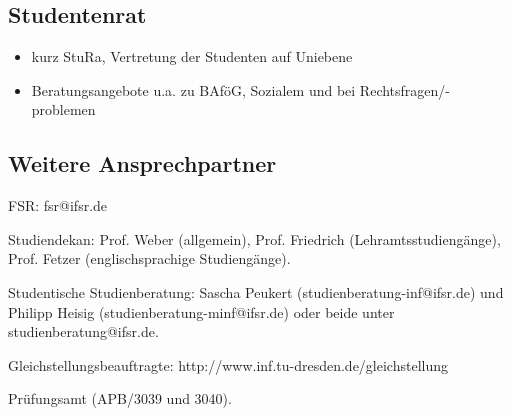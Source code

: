 \documentclass[a4paper,12pt]{report}
\begin{document}
\subsection{Studentenrat}
\begin{itemize}
	\item kurz StuRa, Vertretung der Studenten auf Uniebene
	\item Beratungsangebote u.a. zu BAföG, Sozialem und bei Rechtsfragen/-problemen
\end{itemize}

\subsection{Weitere Ansprechpartner}
\begin{itemize*}
	\item FSR: fsr@ifsr.de
	\item Studiendekan: Prof. Weber (allgemein), Prof. Friedrich (Lehramtsstudiengänge), Prof. Fetzer (englischsprachige Studiengänge).
	\item Studentische Studienberatung: Sascha Peukert (studienberatung-inf@ifsr.de) und Philipp Heisig (studienberatung-minf@ifsr.de) oder beide unter studienberatung@ifsr.de.
	\item Gleichstellungsbeauftragte: http://www.inf.tu-dresden.de/gleichstellung 
	\item Prüfungsamt (APB/3039 und 3040).
\end{itemize*}
\end{document}
